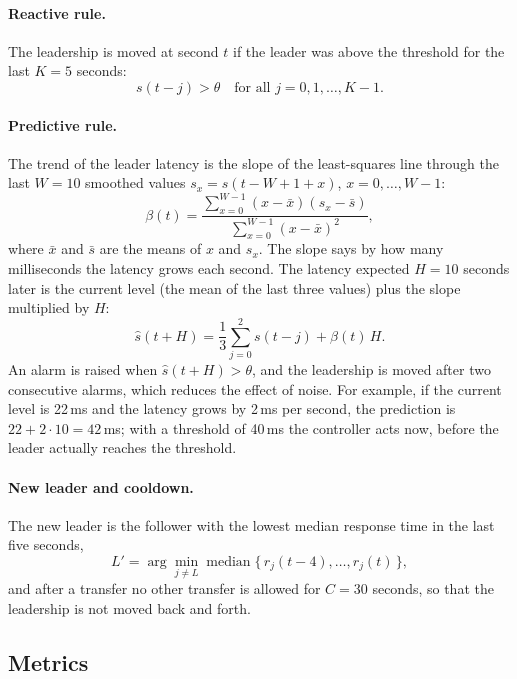 \documentclass[11pt,a4paper]{article}
\begin{document}
\paragraph{Reactive rule.} The leadership is moved at second $t$ if the leader was above the threshold for the last $K = 5$ seconds:
\begin{equation}
  s(t-j) > \theta \quad \text{for all } j = 0, 1, \dots, K-1.
\end{equation}

\paragraph{Predictive rule.} The trend of the leader latency is the slope of the least-squares line through the last $W = 10$ smoothed values $s_x = s(t-W+1+x)$, $x = 0, \dots, W-1$:
\begin{equation}
  \beta(t) = \frac{\sum_{x=0}^{W-1} (x - \bar{x})(s_x - \bar{s})}{\sum_{x=0}^{W-1} (x - \bar{x})^2},
\end{equation}
where $\bar{x}$ and $\bar{s}$ are the means of $x$ and $s_x$. The slope says by how many milliseconds the latency grows each second. The latency expected $H = 10$ seconds later is the current level (the mean of the last three values) plus the slope multiplied by $H$:
\begin{equation}
  \hat{s}(t+H) = \frac{1}{3}\sum_{j=0}^{2} s(t-j) + \beta(t)\, H.
\end{equation}
An alarm is raised when $\hat{s}(t+H) > \theta$, and the leadership is moved after two consecutive alarms, which reduces the effect of noise. For example, if the current level is 22\,ms and the latency grows by 2\,ms per second, the prediction is $22 + 2 \cdot 10 = 42$\,ms; with a threshold of 40\,ms the controller acts now, before the leader actually reaches the threshold.

\paragraph{New leader and cooldown.} The new leader is the follower with the lowest median response time in the last five seconds,
\begin{equation}
  L' = \arg\min_{j \neq L} \operatorname{median}\{\, r_j(t-4), \dots, r_j(t) \,\},
\end{equation}
and after a transfer no other transfer is allowed for $C = 30$ seconds, so that the leadership is not moved back and forth.

\subsection{Metrics}
\end{document}
